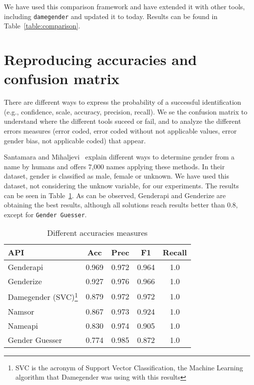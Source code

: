 \documentclass[a4paper]{article}
\begin{document}
We have used this comparison framework and have extended it with other tools, including \texttt{damegender} and updated it to today.
Results can be found in Table~\ref{table:comparison}.



\section{Reproducing accuracies and confusion matrix}

There are different ways to express the probability of a successful identification (e.g., confidence, scale, accuracy, precision, recall).
We se the confusion matrix to understand where the different tools suceed or fail, and to analyze the different errors measures (error coded, error coded without not applicable values, error gender bias, not applicable coded) that appear.

Santamara and Mihaljevi~\cite{10.7717/peerj-cs.156} explain different ways to determine gender from a name by humans and offers 7,000 names applying these methods. 
In their dataset, gender is classified as male, female or unknown. 
We have used this dataset, not considering the unknow variable, for our experiments.
The results can be seen in Table~\ref{table:DifferentAccuraciesMeasures}.
As can be observed, Genderapi and Genderize are obtaining the best results, although all solutions reach results better than 0.8, except for \texttt{Gender Guesser}.



\begin{table}
\footnotesize
\begin{tabular}[]{lcccc}
  \hline
  API & Acc & Prec & F1 & Recall\tabularnewline
\hline
Genderapi & 0.969 & 0.972 & 0.964 & 1.0\tabularnewline
Genderize & 0.927 & 0.976 & 0.966 & 1.0\tabularnewline
Damegender (SVC)\footnote{SVC is the acronym of Support Vector Classification, the Machine Learning algorithm that Damegender was using with this results} & 0.879 & 0.972 & 0.972 & 1.0\tabularnewline
Namsor & 0.867 & 0.973 & 0.924 & 1.0\tabularnewline
Nameapi & 0.830 & 0.974 & 0.905 & 1.0\tabularnewline
Gender Guesser & 0.774 & 0.985 & 0.872 & 1.0\tabularnewline
\hline
\end{tabular}
\caption{Different accuracies measures}
\label{table:DifferentAccuraciesMeasures}
\end{table}
\end{document}
